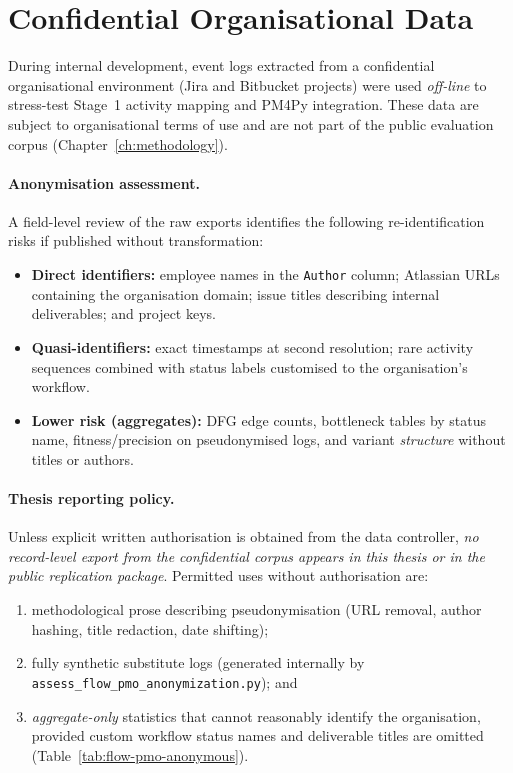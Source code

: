 \section{Confidential Organisational Data}
\label{sec:impl-confidential}

During internal development, event logs extracted from a confidential
organisational environment (Jira and Bitbucket projects) were used
\emph{off-line} to stress-test Stage~1 activity mapping and PM4Py
integration. These data are subject to organisational terms of use and are
not part of the public evaluation corpus (Chapter~\ref{ch:methodology}).

\paragraph{Anonymisation assessment.}
A field-level review of the raw exports identifies the following
re-identification risks if published without transformation:
\begin{itemize}
    \item \textbf{Direct identifiers:} employee names in the \texttt{Author}
    column; Atlassian URLs containing the organisation domain; issue titles
    describing internal deliverables; and project keys.
    \item \textbf{Quasi-identifiers:} exact timestamps at second resolution;
    rare activity sequences combined with status labels customised to the
    organisation's workflow.
    \item \textbf{Lower risk (aggregates):} DFG edge counts, bottleneck tables
    by status name, fitness/precision on pseudonymised logs, and variant
    \emph{structure} without titles or authors.
\end{itemize}

\paragraph{Thesis reporting policy.}
Unless explicit written authorisation is obtained from the data controller,
\emph{no record-level export from the confidential corpus appears in this thesis
or in the public replication package}. Permitted uses without authorisation are:
\begin{enumerate}
    \item methodological prose describing pseudonymisation (URL removal, author
    hashing, title redaction, date shifting);
    \item fully synthetic substitute logs (generated internally by
    \texttt{assess\_flow\_pmo\_anonymization.py}); and
    \item \emph{aggregate-only} statistics that cannot reasonably identify the
    organisation, provided custom workflow status names and deliverable titles
    are omitted (Table~\ref{tab:flow-pmo-anonymous}).
\end{enumerate}

